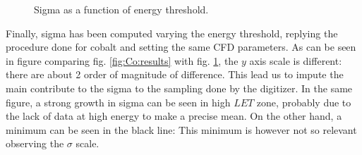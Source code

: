 \documentclass[11pt,a4 paper]{article}
\begin{document}
\begin{figure}[H]
    \centering
    \caption{Sigma as a function of energy threshold.}
    \label{fig:sigma:sim}
\end{figure}

Finally, sigma has been computed varying the energy threshold, replying the procedure done for cobalt and setting the same CFD parameters. As can be seen in figure comparing fig. \ref{fig:Co:results} with fig. \ref{fig:sigma:sim}, the $y$ axis scale is different: there are about 2 order of magnitude of difference. This lead us to impute the main contribute to the sigma to the sampling done by the digitizer. In the same figure, a strong growth in sigma can be seen in high $LET$ zone, probably due to the lack of data at high energy to make a precise mean. On the other hand, a minimum can be seen in the black line: This minimum is however not so relevant observing the $\sigma$ scale.
\end{document}
